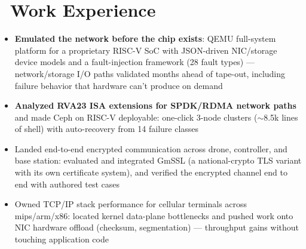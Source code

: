 \documentclass{resume}
\begin{document}
\section{\faBriefcase\ Work Experience}
\begin{onehalfspacing}
\begin{itemize}
	\item \textbf{Emulated the network before the chip exists}: QEMU full-system platform for a proprietary RISC-V SoC with JSON-driven NIC/storage device models and a fault-injection framework (28 fault types) --- network/storage I/O paths validated months ahead of tape-out, including failure behavior that hardware can't produce on demand
	\item \textbf{Analyzed RVA23 ISA extensions for SPDK/RDMA network paths} and made Ceph on RISC-V deployable: one-click 3-node clusters ($\sim$8.5k lines of shell) with auto-recovery from 14 failure classes
\end{itemize}
\end{onehalfspacing}

\begin{onehalfspacing}
\begin{itemize}
	\item Landed end-to-end encrypted communication across drone, controller, and base station: evaluated and integrated GmSSL (a national-crypto TLS variant with its own certificate system), and verified the encrypted channel end to end with authored test cases
\end{itemize}
\end{onehalfspacing}

\begin{onehalfspacing}
\begin{itemize}
	\item Owned TCP/IP stack performance for cellular terminals across mips/arm/x86: located kernel data-plane bottlenecks and pushed work onto NIC hardware offload (checksum, segmentation) --- throughput gains without touching application code
\end{itemize}
\end{onehalfspacing}
\end{document}

